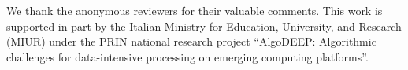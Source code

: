 \documentclass{sigplanconf}
\begin{document}
\acks

We thank the anonymous reviewers for their valuable comments. This work is supported in part by the Italian Ministry for Education,
University, and Research (MIUR) under the PRIN national research project ``AlgoDEEP: Algorithmic challenges for data-intensive processing on emerging computing platforms''.


\softraggedright

\balance

\end{document}
